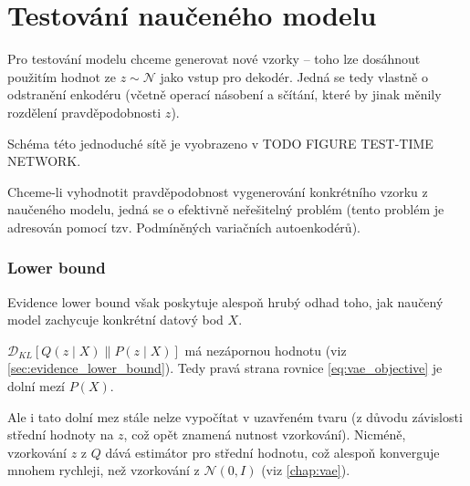 \section{Testování naučeného modelu}
Pro testování modelu chceme generovat nové vzorky – toho lze dosáhnout použitím hodnot ze $z \sim \mathcal{N}$ jako vstup pro dekodér.
Jedná se tedy vlastně o odstranění enkodéru (včetně operací násobení a sčítání, které by jinak měnily rozdělení pravděpodobnosti $z$).

Schéma této jednoduché sítě je vyobrazeno v TODO FIGURE TEST-TIME NETWORK.

Chceme-li vyhodnotit pravděpodobnost vygenerování konkrétního vzorku z naučeného modelu, jedná se o efektivně neřešitelný problém (tento problém je adresován pomocí tzv. Podmíněných variačních autoenkodérů).

\subsubsection{Lower bound}
Evidence lower bound však poskytuje alespoň hrubý odhad toho, jak naučený model zachycuje konkrétní datový bod $X$.

$\mathcal{D}_{KL}\left[ Q(z\mid X) \parallel P(z\mid X) \right]$ má nezápornou hodnotu (viz \autoref{sec:evidence_lower_bound}).
Tedy pravá strana rovnice \autoref{eq:vae_objective} je dolní mezí $P(X)$.

Ale i tato dolní mez stále nelze vypočítat v uzavřeném tvaru (z důvodu závislosti střední hodnoty na $z$, což opět znamená nutnost vzorkování).
Nicméně, vzorkování $z$ z $Q$ dává estimátor pro střední hodnotu, což alespoň konverguje mnohem rychleji, než vzorkování z $\mathcal{N}(0, I)$ (viz \autoref{chap:vae}).
